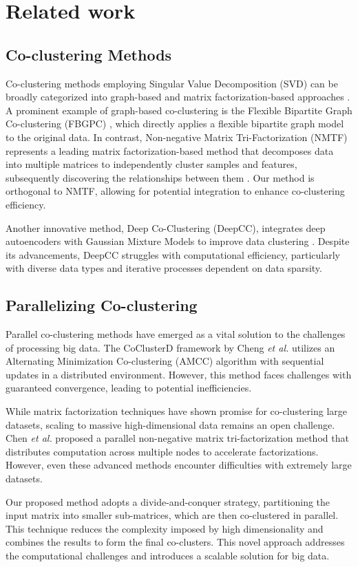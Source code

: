 
\section{Related work}
\label{sec:related_work}
\subsection{Co-clustering Methods}
Co-clustering methods employing Singular Value Decomposition (SVD) can be broadly categorized into graph-based and matrix factorization-based approaches
\cite{dhillon2001CoclusteringDocumentsWords}. A prominent example of graph-based co-clustering is the Flexible Bipartite Graph Co-clustering (FBGPC) \cite{chen2023FastFlexibleBipartitea}, which directly applies a flexible bipartite graph model to the original data. In contrast, Non-negative Matrix Tri-Factorization (NMTF) represents a leading matrix factorization-based method that decomposes data into multiple matrices to independently cluster samples and features, subsequently discovering the relationships between them \cite{long2005CoclusteringBlockValue}. Our method is orthogonal to NMTF, allowing for potential integration to enhance co-clustering efficiency.

Another innovative method, Deep Co-Clustering (DeepCC), integrates deep autoencoders with Gaussian Mixture Models to improve data clustering \cite{dongkuanxu2019DeepCoClustering}. Despite its advancements, DeepCC struggles with computational efficiency, particularly with diverse data types and iterative processes dependent on data sparsity.

\subsection{Parallelizing Co-clustering}

Parallel co-clustering methods have emerged as a vital solution to the challenges of processing big data. The CoClusterD framework by Cheng \textit{et al.} \cite{cheng2015CoClusterDDistributedFramework} utilizes an Alternating Minimization Co-clustering (AMCC) algorithm with sequential updates in a distributed environment. However, this method faces challenges with guaranteed convergence, leading to potential inefficiencies.

While matrix factorization techniques have shown promise for co-clustering large datasets, scaling to massive high-dimensional data remains an open challenge. Chen \textit{et al.}\cite{chen2023ParallelNonNegativeMatrix} proposed a parallel non-negative matrix tri-factorization method that distributes computation across multiple nodes to accelerate factorizations. However, even these advanced methods encounter difficulties with extremely large datasets.

Our proposed method adopts a divide-and-conquer strategy, partitioning the input matrix into smaller sub-matrices, which are then co-clustered in parallel. This technique reduces the complexity imposed by high dimensionality and combines the results to form the final co-clusters. This novel approach addresses the computational challenges and introduces a scalable solution for big data.